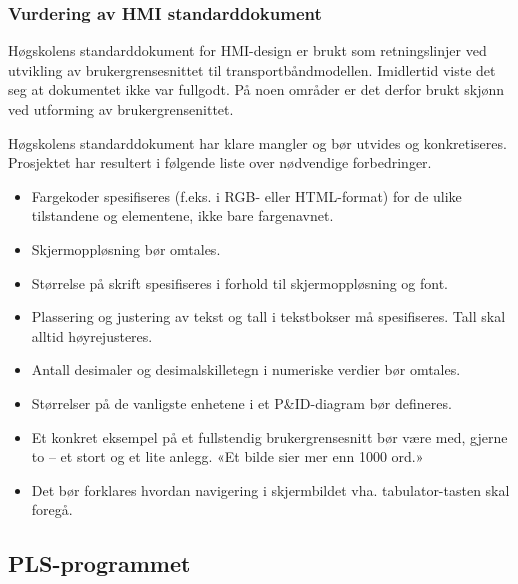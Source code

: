 \documentclass[Visionprosjekt.tex]{subfiles}
\begin{document}
\subsubsection{Vurdering av HMI standarddokument}
\label{subsec:HMI-vurdering}

Høgskolens standarddokument for HMI-design er brukt som retningslinjer ved utvikling av brukergrensesnittet til transportbåndmodellen.
Imidlertid viste det seg  at dokumentet ikke var fullgodt. På noen områder er det derfor brukt skjønn ved utforming av brukergrensenittet.




Høgskolens standarddokument har klare mangler og bør utvides og konkretiseres.
Prosjektet har resultert i følgende liste over nødvendige forbedringer.


\begin{itemize}
	\item Fargekoder spesifiseres (f.eks. i RGB- eller HTML-format) for de ulike tilstandene og elementene, ikke bare fargenavnet.
    \item Skjermoppløsning  bør omtales.
    \item Størrelse på skrift spesifiseres i forhold til skjermoppløsning og font.
    \item Plassering og justering av tekst og tall i tekstbokser må spesifiseres. Tall skal alltid høyrejusteres.
    \item Antall desimaler og desimalskilletegn i numeriske verdier bør omtales.
    \item Størrelser på de vanligste enhetene i et P\&ID-diagram bør defineres.
    \item Et konkret eksempel på et fullstendig brukergrensesnitt bør være med, gjerne to -- et stort og et lite anlegg. «Et bilde sier mer enn 1000 ord.»
    \item Det bør forklares hvordan navigering i skjermbildet vha. tabulator-tasten skal foregå.
\end{itemize}




\subsection{PLS-programmet}
\end{document}
